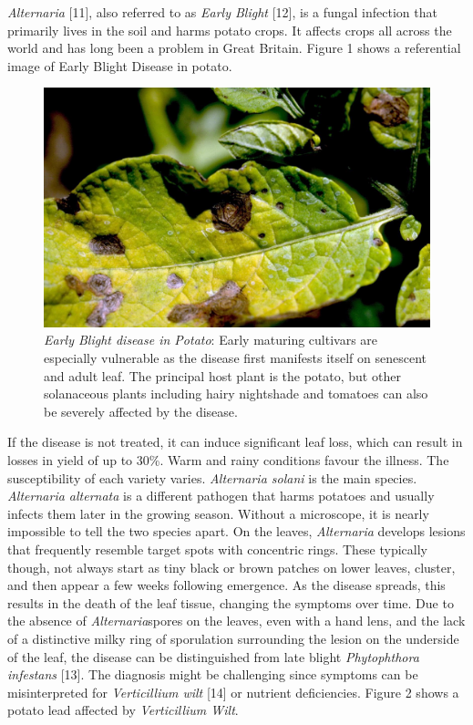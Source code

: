 \documentclass[conference]{IEEEtran}
\begin{document}
\textit{Alternaria} [11], also referred to as \textit{Early Blight} [12], is a fungal infection that primarily lives in the soil and harms potato crops. It affects crops all across the world and has long been a problem in Great Britain. Figure 1 shows a referential image of Early Blight Disease in potato. 
\begin{figure}[htbp]
\label{fig1}
\centerline{\includegraphics[width = \linewidth]{EarlyBlight}}
\caption{\textit{Early Blight disease in Potato}: Early maturing cultivars are especially vulnerable as the disease first manifests itself on senescent and adult leaf. The principal host plant is the potato, but other solanaceous plants including hairy nightshade and tomatoes can also be severely affected by the disease.}
\end{figure}
If the disease is not treated, it can induce significant leaf loss, which can result in losses in yield of up to 30\%. Warm and rainy conditions favour the illness. The susceptibility of each variety varies. \textit{Alternaria solani} is the main species. \textit{Alternaria alternata} is a different pathogen that harms potatoes and usually infects them later in the growing season. Without a microscope, it is nearly impossible to tell the two species apart. On the leaves, \textit{Alternaria} develops lesions that frequently resemble target spots with concentric rings. These typically though, not always start as tiny black or brown patches on lower leaves, cluster, and then appear a few weeks following emergence. As the disease spreads, this results in the death of the leaf tissue, changing the symptoms over time. Due to the absence of \textit{Alternaria}spores on the leaves, even with a hand lens, and the lack of a distinctive milky ring of sporulation surrounding the lesion on the underside of the leaf, the disease can be distinguished from late blight \textit{Phytophthora infestans} [13]. The diagnosis might be challenging since symptoms can be misinterpreted for \textit{Verticillium wilt} [14] or nutrient deficiencies. Figure 2 shows a potato lead affected by \textit{Verticillium Wilt}. 
\end{document}
